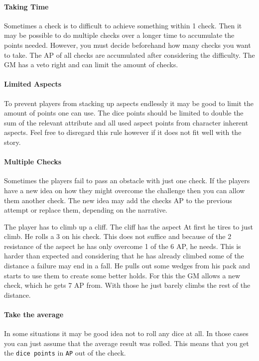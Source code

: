 \documentclass[11pt]{article}
\begin{document}
{\paragraph*{Taking Time}
\label{sec:orgc20b862}
Sometimes a check is to difficult to achieve something within 1 check. Then it may be possible to do multiple checks over a longer time to accumulate the points needed. However, you must decide beforehand how many checks you want to take. The AP of all checks are accumulated after considering the difficulty. The GM has a veto right and can limit the amount of checks.
\paragraph*{Limited Aspects}
\label{sec:org8085c7e}
To prevent players from stacking up aspects endlessly it may be good to limit the amount of points one can use. The dice points should be limited to double the sum of the relevant attribute and all used aspect points from character inherent aspects. Feel free to disregard this rule however if it does not fit well with the story.
\paragraph*{Multiple Checks}
\label{sec:org2618560}
Sometimes the players fail to pass an obstacle with just one check. If the players have a new idea on how they might overcome the challenge then you can allow them another check. The new idea may add the checks AP to the previous attempt or replace them, depending on the narrative.

\begin{pwexample}
The player has to climb up a cliff. The cliff has the aspect  At first he tires to just climb. He rolls a 3 on his check. This does not suffice and because of the 2 resistance of the aspect he has only overcome 1 of the 6 AP, he needs. This is harder than expected and considering that he has already climbed some of the distance a failure may end in a fall. He pulls out some wedges from his pack and starts to use them to create some better holds. For this the GM allows a new check, which he gets 7 AP from. With those he just barely climbs the rest of the distance.
\end{pwexample}
\paragraph*{Take the average}
\label{sec:org14ee2bf}
In some situations it may be good idea not to roll any dice at all. In those cases you can just assume that the average result was rolled. This means that you get the \texttt{dice points} in \texttt{AP} out of the check. 
}
\end{document}
